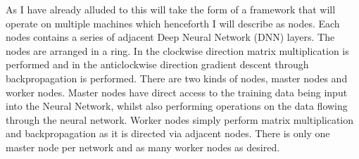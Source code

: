 As I have already alluded to this will take the form of a framework that will
operate on multiple machines which henceforth I will describe as nodes. Each
nodes contains a series of adjacent Deep Neural Network (DNN) layers. The
nodes are arranged in a ring. In the clockwise direction matrix multiplication
is performed and in the anticlockwise direction gradient descent through
backpropagation is performed. There are two kinds of nodes, master nodes and
worker nodes. Master nodes have direct access to the training data being input
into the Neural Network, whilst also performing operations on the data flowing
through the neural network. Worker nodes simply perform matrix multiplication
and backpropagation as it is directed via adjacent nodes. There is only one
master node per network and as many worker nodes as desired. 

